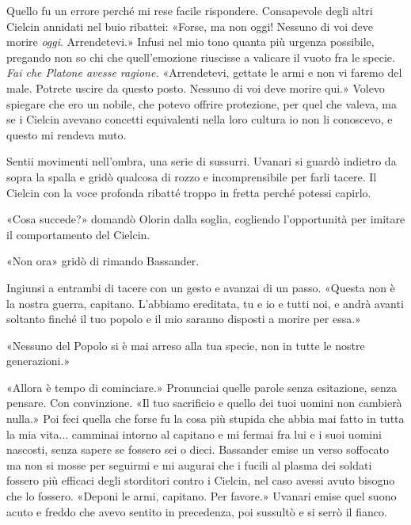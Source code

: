 Quello fu un errore perché mi rese facile rispondere. Consapevole degli
altri Cielcin annidati nel buio ribattei: «Forse, ma non oggi! Nessuno
di voi deve morire \emph{oggi}. Arrendetevi.» Infusi nel mio tono quanta
più urgenza possibile, pregando non so chi che quell'emozione riuscisse
a valicare il vuoto fra le specie. \emph{Fai che Platone avesse
	ragione.} «Arrendetevi, gettate le armi e non vi faremo del male.
Potrete uscire da questo posto. Nessuno di voi deve morire qui.» Volevo
spiegare che ero un nobile, che potevo offrire protezione, per quel che
valeva, ma se i Cielcin avevano concetti equivalenti nella loro cultura
io non li conoscevo, e questo mi rendeva muto.

Sentii movimenti nell'ombra, una serie di sussurri. Uvanari si guardò
indietro da sopra la spalla e gridò qualcosa di rozzo e incomprensibile
per farli tacere. Il Cielcin con la voce profonda ribatté troppo in
fretta perché potessi capirlo.

«Cosa succede?» domandò Olorin dalla soglia, cogliendo l'opportunità per
imitare il comportamento del Cielcin.

«Non ora» gridò di rimando Bassander.

Ingiunsi a entrambi di tacere con un gesto e avanzai di un passo.
«Questa non è la nostra guerra, capitano. L'abbiamo ereditata, tu e io e
tutti noi, e andrà avanti soltanto finché il tuo popolo e il mio saranno
disposti a morire per essa.»

«Nessuno del Popolo si è mai arreso alla tua specie, non in tutte le
nostre generazioni.»

«Allora è tempo di cominciare.» Pronunciai quelle parole senza
esitazione, senza pensare. Con convinzione. «Il tuo sacrificio e quello
dei tuoi uomini non cambierà nulla.» Poi feci quella che forse fu la
cosa più stupida che abbia mai fatto in tutta la mia vita... camminai
intorno al capitano e mi fermai fra lui e i suoi uomini nascosti, senza
sapere se fossero sei o dieci. Bassander emise un verso soffocato ma non
si mosse per seguirmi e mi augurai che i fucili al plasma dei soldati
fossero più efficaci degli storditori contro i Cielcin, nel caso avessi
avuto bisogno che lo fossero. «Deponi le armi, capitano. Per favore.»
Uvanari emise quel suono acuto e freddo che avevo sentito in precedenza,
poi sussultò e si serrò il fianco.

